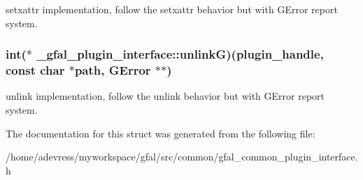 setxattr implementation, follow the setxattr behavior but with GError report system. 
\subsubsection{\setlength{\rightskip}{0pt plus 5cm}int($\ast$ \bf{\_\-gfal\_\-plugin\_\-interface::unlink\-G})(plugin\_\-handle, const char $\ast$path, GError $\ast$$\ast$)}\label{struct__gfal__plugin__interface_75692c1e9487ff9ed7fce15dc2ddac62}


unlink implementation, follow the unlink behavior but with GError report system. 

The documentation for this struct was generated from the following file:\begin{CompactItemize}
\item 
/home/adevress/myworkspace/gfal/src/common/gfal\_\-common\_\-plugin\_\-interface.h\end{CompactItemize}
